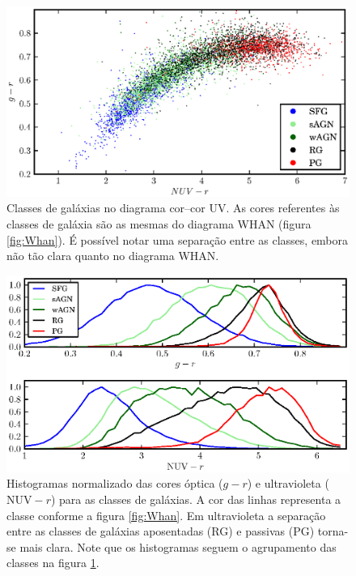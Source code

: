 \begin{figure}
	\includegraphics{figuras/uvcolor-color-class.eps}
	\caption[Diagrama cor--cor UV de acordo com o tipo de galáxia.]
	{Classes de galáxias no diagrama cor--cor UV. As cores referentes às classes de
	galáxia são as mesmas do diagrama WHAN (figura \ref{fig:Whan}). É possível
	notar uma separação entre as classes, embora não tão clara quanto no diagrama
	WHAN.}
	\label{fig:ColorClass}
\end{figure}

\begin{figure}
	\includegraphics{figuras/histo_galtype_color.eps}
	\caption[Histogramas de cores para as classes de galáxias.]
	{Histogramas normalizado das cores óptica ($g-r$) e ultravioleta
	($\mathrm{NUV}-r$) para as classes de galáxias. A cor das linhas representa a
	classe conforme a figura \ref{fig:Whan}. Em ultravioleta a separação entre as
	classes de galáxias aposentadas (RG) e passivas (PG) torna-se mais clara. Note
	que os histogramas seguem o agrupamento das classes na figura
	\ref{fig:ColorClass}.}
	\label{fig:HistogramaCorClasse}
\end{figure}


